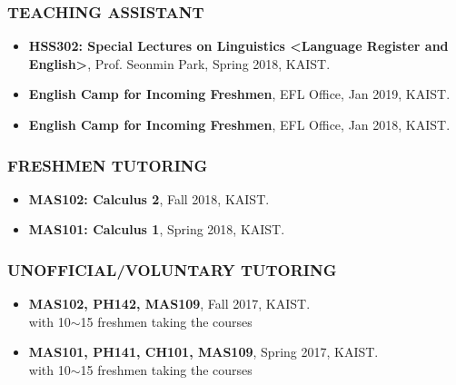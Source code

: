 \documentclass[10pt,a4]{article}
\begin{document}
\begin{small}
\subsubsection*{TEACHING ASSISTANT}
\begin{itemize}


\item {\bf HSS302: Special Lectures on Linguistics \textless Language Register and English\textgreater}, Prof. Seonmin Park, Spring 2018, KAIST.

\item {\bf English Camp for Incoming Freshmen}, EFL Office, Jan 2019, KAIST.

\item {\bf English Camp for Incoming Freshmen}, EFL Office, Jan 2018, KAIST.

\end{itemize}

\subsubsection*{FRESHMEN TUTORING}
\begin{itemize}

\item {\bf MAS102: Calculus 2}, Fall 2018, KAIST.

\item {\bf MAS101: Calculus 1}, Spring 2018, KAIST.

\end{itemize}

\subsubsection*{UNOFFICIAL/VOLUNTARY TUTORING}
\begin{itemize}

\item {\bf MAS102, PH142, MAS109}, Fall 2017, KAIST. \\
with 10$\sim$15 freshmen taking the courses

\item {\bf MAS101, PH141, CH101, MAS109}, Spring 2017, KAIST. \\
with 10$\sim$15 freshmen taking the courses



\end{itemize}
\end{small}
\end{document}
